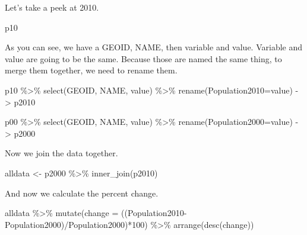 \documentclass[
  letterpaper,
  DIV=11,
  numbers=noendperiod]{scrreprt}
\newenvironment{Shaded}{\begin{snugshade}}{\end{snugshade}}
\newcommand{\AttributeTok}[1]{\textcolor[rgb]{0.40,0.45,0.13}{#1}}
\newcommand{\DecValTok}[1]{\textcolor[rgb]{0.68,0.00,0.00}{#1}}
\newcommand{\FunctionTok}[1]{\textcolor[rgb]{0.28,0.35,0.67}{#1}}
\newcommand{\NormalTok}[1]{\textcolor[rgb]{0.00,0.23,0.31}{#1}}
\newcommand{\OtherTok}[1]{\textcolor[rgb]{0.00,0.23,0.31}{#1}}
\newcommand{\SpecialCharTok}[1]{\textcolor[rgb]{0.37,0.37,0.37}{#1}}
\begin{document}
Let's take a peek at 2010.

\begin{Shaded}
\begin{Highlighting}[]
\NormalTok{p10}
\end{Highlighting}
\end{Shaded}

As you can see, we have a GEOID, NAME, then variable and value. Variable
and value are going to be the same. Because those are named the same
thing, to merge them together, we need to rename them.

\begin{Shaded}
\begin{Highlighting}[]
\NormalTok{p10 }\SpecialCharTok{\%\textgreater{}\%} \FunctionTok{select}\NormalTok{(GEOID, NAME, value) }\SpecialCharTok{\%\textgreater{}\%} \FunctionTok{rename}\NormalTok{(}\AttributeTok{Population2010=}\NormalTok{value) }\OtherTok{{-}\textgreater{}}\NormalTok{ p2010}

\NormalTok{p00 }\SpecialCharTok{\%\textgreater{}\%} \FunctionTok{select}\NormalTok{(GEOID, NAME, value) }\SpecialCharTok{\%\textgreater{}\%} \FunctionTok{rename}\NormalTok{(}\AttributeTok{Population2000=}\NormalTok{value) }\OtherTok{{-}\textgreater{}}\NormalTok{ p2000}
\end{Highlighting}
\end{Shaded}

Now we join the data together.

\begin{Shaded}
\begin{Highlighting}[]
\NormalTok{alldata }\OtherTok{\textless{}{-}}\NormalTok{ p2000 }\SpecialCharTok{\%\textgreater{}\%} \FunctionTok{inner\_join}\NormalTok{(p2010)}
\end{Highlighting}
\end{Shaded}

And now we calculate the percent change.

\begin{Shaded}
\begin{Highlighting}[]
\NormalTok{alldata }\SpecialCharTok{\%\textgreater{}\%} \FunctionTok{mutate}\NormalTok{(}\AttributeTok{change =}\NormalTok{ ((Population2010}\SpecialCharTok{{-}}\NormalTok{Population2000)}\SpecialCharTok{/}\NormalTok{Population2000)}\SpecialCharTok{*}\DecValTok{100}\NormalTok{) }\SpecialCharTok{\%\textgreater{}\%} \FunctionTok{arrange}\NormalTok{(}\FunctionTok{desc}\NormalTok{(change))}
\end{Highlighting}
\end{Shaded}
\end{document}
